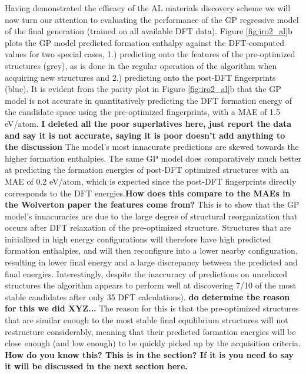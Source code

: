Having demonstrated the efficacy of the AL materials discovery scheme we will now turn our attention to evaluating the performance of the GP regressive model of the final generation (trained on all available \IrOthree DFT data).
%
Figure \ref{fig:iro2_al}b plots the GP model predicted formation enthalpy against the DFT-computed values for two special cases,
1.) predicting onto the features of the pre-optimized structures (grey), as is done in the regular operation of the algorithm when acquiring new structures and
2.) predicting onto the post-DFT fingerprints (blue).
%
It is evident from the parity plot in Figure \ref{fig:iro2_al}b that the GP model is not accurate in quantitatively predicting the DFT formation energy of the candidate space using the pre-optimized fingerprints,
with a MAE of \mytilde\num{1.5} eV/atom. \textbf{I deleted all the poor superlatives here, just report the data and say it is not accurate, saying it is poor doesn't add anything to the discussion}
%
The model's most innacurate predictions are skewed towards the higher formation enthalpies.
%
The same GP model does comparatively much better at predicting the formation energies of post-DFT optimized structures with an MAE of \mytilde\num{0.2} eV/atom,
which is expected since the post-DFT fingerprints directly corresponds to the DFT energies.\textbf{How does this compare to the MAEs in the Wolverton paper the features come from?}
%
This is to show that the GP model's innacuracies are due to the large degree of structural reorganization that occurs after DFT relaxation of the pre-optimized structure.
%
Structures that are initialized in high energy configurations will therefore have high predicted formation enthalpies, and will then reconfigure into a lower nearby configuration, resulting in lower final energy and a large discrepancy between the predicted and final energies.
%
Interestingly, despite the inaccuracy of predictions on unrelaxed structures the algorithm appears to perform well at discovering \num{7/10} of the most stable candidates after only \num{35} DFT calculations). \textbf{do determine the reason for this we did XYZ...}
%
The reason for this is that the pre-optimized structures that are similar enough to the most stable final equilibrium structures will not restructure considerably, meaning that their predicted formation energies will be close enough (and low enough) to be quickly picked up by the acquisition criteria. \textbf{How do you know this?  This is in the section?  If it is you need to say it will be discussed in the next section here.}
%



